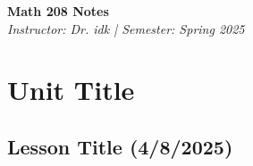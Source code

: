 \documentclass[12pt]{article}
\begin{document}
\begin{center}
    {\LARGE \textbf{Math 208 Notes}} \\
    \vspace{0.5em}
    {\large \textit{Instructor: Dr. idk \quad | \quad Semester: Spring 2025}} \\
    \vspace{0.5em}
\end{center}

\tableofcontents
\newpage


\section{Unit Title}

\subsection{Lesson Title (4/8/2025)}
\end{document}
